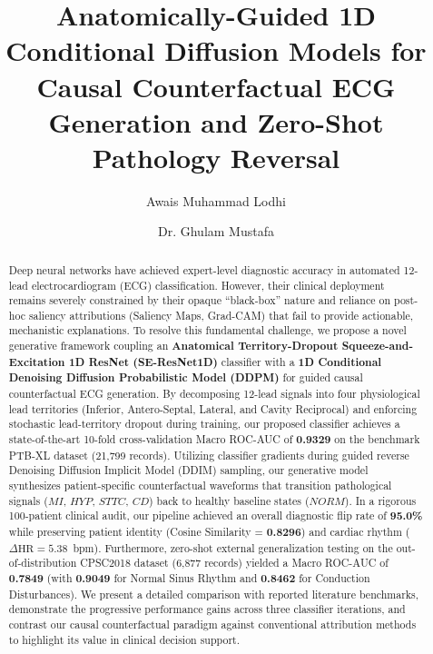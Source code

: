 \documentclass[5p,twocolumn,10pt]{elsarticle}
\begin{document}
\begin{frontmatter}

\title{Anatomically-Guided 1D Conditional Diffusion Models for Causal Counterfactual ECG Generation and Zero-Shot Pathology Reversal}

\author[1]{Awais Muhammad Lodhi}
\author[1]{Dr. Ghulam Mustafa}

\address[1]{Department of Computer Science, FOIT\&CS, UCP, Pakistan}

\begin{abstract}
Deep neural networks have achieved expert-level diagnostic accuracy in automated 12-lead electrocardiogram (ECG) classification. However, their clinical deployment remains severely constrained by their opaque ``black-box'' nature and reliance on post-hoc saliency attributions (Saliency Maps, Grad-CAM) that fail to provide actionable, mechanistic explanations. To resolve this fundamental challenge, we propose a novel generative framework coupling an \textbf{Anatomical Territory-Dropout Squeeze-and-Excitation 1D ResNet (SE-ResNet1D)} classifier with a \textbf{1D Conditional Denoising Diffusion Probabilistic Model (DDPM)} for guided causal counterfactual ECG generation. By decomposing 12-lead signals into four physiological lead territories (Inferior, Antero-Septal, Lateral, and Cavity Reciprocal) and enforcing stochastic lead-territory dropout during training, our proposed classifier achieves a state-of-the-art 10-fold cross-validation Macro ROC-AUC of \textbf{0.9329} on the benchmark PTB-XL dataset (21,799 records). Utilizing classifier gradients during guided reverse Denoising Diffusion Implicit Model (DDIM) sampling, our generative model synthesizes patient-specific counterfactual waveforms that transition pathological signals ($MI$, $HYP$, $STTC$, $CD$) back to healthy baseline states ($NORM$). In a rigorous 100-patient clinical audit, our pipeline achieved an overall diagnostic flip rate of \textbf{95.0\%} while preserving patient identity (Cosine Similarity = \textbf{0.8296}) and cardiac rhythm ($\Delta\text{HR} = 5.38$~bpm). Furthermore, zero-shot external generalization testing on the out-of-distribution CPSC2018 dataset (6,877 records) yielded a Macro ROC-AUC of \textbf{0.7849} (with \textbf{0.9049} for Normal Sinus Rhythm and \textbf{0.8462} for Conduction Disturbances). We present a detailed comparison with reported literature benchmarks, demonstrate the progressive performance gains across three classifier iterations, and contrast our causal counterfactual paradigm against conventional attribution methods to highlight its value in clinical decision support.
\end{abstract}


\end{frontmatter}
\end{document}
